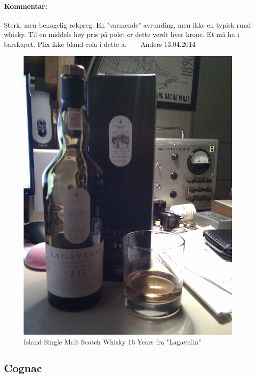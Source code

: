 \documentclass[12pt,a4paper,oneside,norsk]{article}
\begin{document}
\paragraph{Kommentar:}Sterk, men behagelig røkpreg. En "varmende" avrunding, men ikke en typisk rund whisky. Til en middels høy pris på polet er dette verdt hver krone. Et må ha i barskapet. Plix ikke bland cola i dette a.
\newline
-- -- Anders 13.04.2014

\begin{figure} [H]
\centering
\includegraphics[scale=0.1, angle=0]{Bilder/Sprit/Lagavulin16aar.jpg}
\caption{Island Single Malt Scotch Whisky 16 Years fra "Lagavulin"}
\end{figure}


\newpage
\subsection{Cognac}
\end{document}
